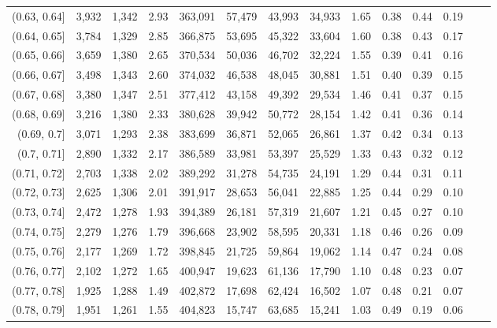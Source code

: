 \begin{tabular}{rrrrrrrrrrrrrr}
(0.63, 0.64]   &  3,932 &  1,342 &    2.93 &  363,091 &   57,479 &  43,993 &  34,933 &  1.65 &  0.38 &  0.44 &      0.19 \\
(0.64, 0.65]   &  3,784 &  1,329 &    2.85 &  366,875 &   53,695 &  45,322 &  33,604 &  1.60 &  0.38 &  0.43 &      0.17 \\
(0.65, 0.66]   &  3,659 &  1,380 &    2.65 &  370,534 &   50,036 &  46,702 &  32,224 &  1.55 &  0.39 &  0.41 &      0.16 \\
(0.66, 0.67]   &  3,498 &  1,343 &    2.60 &  374,032 &   46,538 &  48,045 &  30,881 &  1.51 &  0.40 &  0.39 &      0.15 \\
(0.67, 0.68]   &  3,380 &  1,347 &    2.51 &  377,412 &   43,158 &  49,392 &  29,534 &  1.46 &  0.41 &  0.37 &      0.15 \\
(0.68, 0.69]   &  3,216 &  1,380 &    2.33 &  380,628 &   39,942 &  50,772 &  28,154 &  1.42 &  0.41 &  0.36 &      0.14 \\
(0.69, 0.7]    &  3,071 &  1,293 &    2.38 &  383,699 &   36,871 &  52,065 &  26,861 &  1.37 &  0.42 &  0.34 &      0.13 \\
(0.7, 0.71]    &  2,890 &  1,332 &    2.17 &  386,589 &   33,981 &  53,397 &  25,529 &  1.33 &  0.43 &  0.32 &      0.12 \\
(0.71, 0.72]   &  2,703 &  1,338 &    2.02 &  389,292 &   31,278 &  54,735 &  24,191 &  1.29 &  0.44 &  0.31 &      0.11 \\
(0.72, 0.73]   &  2,625 &  1,306 &    2.01 &  391,917 &   28,653 &  56,041 &  22,885 &  1.25 &  0.44 &  0.29 &      0.10 \\
(0.73, 0.74]   &  2,472 &  1,278 &    1.93 &  394,389 &   26,181 &  57,319 &  21,607 &  1.21 &  0.45 &  0.27 &      0.10 \\
(0.74, 0.75]   &  2,279 &  1,276 &    1.79 &  396,668 &   23,902 &  58,595 &  20,331 &  1.18 &  0.46 &  0.26 &      0.09 \\
(0.75, 0.76]   &  2,177 &  1,269 &    1.72 &  398,845 &   21,725 &  59,864 &  19,062 &  1.14 &  0.47 &  0.24 &      0.08 \\
(0.76, 0.77]   &  2,102 &  1,272 &    1.65 &  400,947 &   19,623 &  61,136 &  17,790 &  1.10 &  0.48 &  0.23 &      0.07 \\
(0.77, 0.78]   &  1,925 &  1,288 &    1.49 &  402,872 &   17,698 &  62,424 &  16,502 &  1.07 &  0.48 &  0.21 &      0.07 \\
(0.78, 0.79]   &  1,951 &  1,261 &    1.55 &  404,823 &   15,747 &  63,685 &  15,241 &  1.03 &  0.49 &  0.19 &      0.06 \\

\end{tabular}
